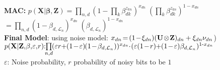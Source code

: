 \documentclass[a4paper,11pt]{article}
\renewcommand{\epsilon}{\varepsilon}
\newcommand{\LL}{\mathcal{L}}
\begin{document}
\begin{multicols}{2}
\textbf{MAC:} $p(\mathbf X|\mathbf \beta, \mathbf Z) = \prod\limits_{n,d} (
   1 - \prod\limits_k \beta_{dk}^{z_{kn}})^{x_{dn}} \; ( \prod\limits_k \beta_{dk}^{z_{kn}})^{1-x_{dn}}$\\
\hspace{2.75cm}$= \prod\limits_{n,d}(1-\beta_{d, \LL_n})^{x_{dn}} \; (\beta_{d, \LL_n})^{1-x_{dn}}$\\

\textbf{Final Model}: using noise model: $x_{dn} \hspace{-0.05cm} = \hspace{-0.05cm} (1 \hspace{-0.05cm}  - \hspace{-0.05cm} \xi_{dn})(\mathbf U \hspace{-0.05cm} \otimes \hspace{-0.05cm}  \mathbf Z)_{dn}+\xi_{dn}\nu_{dn}$)\\
${p(\mathbf X| \mathbf Z,\hspace{-0.05cm}  \mathbf \beta,\hspace{-0.05cm}  \epsilon, \hspace{-0.05cm}  r) \hspace{-0.1cm}:
   \hspace{-0.15cm}\prod\limits_{n,d}\hspace{-0.05cm} (\epsilon r \hspace{-0.08cm} + \hspace{-0.09cm}(1 \hspace{-0.05cm} - \hspace{-0.05cm}\epsilon) \hspace{-0.03cm} (1 \hspace{-0.05cm}  - \hspace{-0.05cm} \beta_{d, \mathcal L_n}))^{x_{dn}}
   \hspace{-0.09cm}\cdot \hspace{-0.06cm}( \epsilon(1 \hspace{-0.05cm} - \hspace{-0.05cm} r) \hspace{-0.09cm} + \hspace{-0.09cm} (1 \hspace{-0.05cm} - \hspace{-0.05cm} \epsilon)\beta_{d,\mathcal L_n})^{1\text{-}x_{dn}}}$\\
$\epsilon$: Noise probability, $r$ probability of noisy bits to be $1$


\end{multicols}
\end{document}
